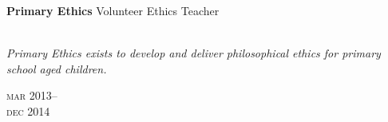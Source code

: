 \vspace{0.2in}

\begin{minipage}[t]{0.75\textwidth}
\textbf{Primary Ethics}\phantom{..} Volunteer Ethics Teacher \\
\\
{\small
\textit{Primary Ethics exists to develop and deliver philosophical ethics for primary school aged children.}
\par}
\end{minipage}
\begin{minipage}[t]{0.25\textwidth}
{
\hfill \textsc{mar} 2013--\\ 
\hspace*{0pt} \hfill \textsc{dec} 2014
\par
}
\end{minipage}


